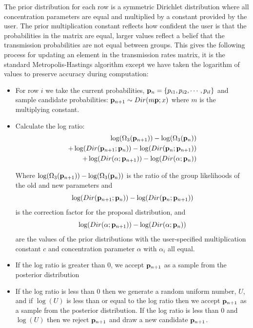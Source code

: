 \documentclass[11pt,a4paper]{report}
\begin{document}
The prior distribution for each row is a symmetric Dirichlet distribution where all concentration parameters are equal and multiplied by a constant provided by the user. The prior multiplication constant reflects how confident the user is that the probabilities in the matrix are equal, larger values reflect a belief that the transmission probabilities are not equal between groups. This gives the following process for updating an element in the transmission rates matrix, it is the standard Metropolis-Hastings algorithm except we have taken the logarithm of values to preserve accuracy during computation:
\begin{itemize}
\item For row $i$ we take the current probabilities, ${\bf p}_{n} =  \{p_{i1},p_{i2}, \cdots,p_{il}\}$ and sample candidate probabilities: ${\bf p}_{n+1} \sim Dir(m{\bf p};x)$ where $m$ is the multiplying constant.
\item Calculate the log ratio: 
\begin{equation}
\begin{split}
\log(\Omega_3({\bf p}_{n+1})) - \log(\Omega_3({\bf p}_{n})) \\ +  \log(Dir({\bf p}_{n+1};{\bf p}_{n})) - \log(Dir({\bf p}_{n};{\bf p}_{n+1})) \\ + \log(Dir({\bf \alpha};{\bf p}_{n+1})) - \log(Dir({\bf \alpha};{\bf p}_{n}))
\end{split}
\end{equation}

Where $\log(\Omega_3({\bf p}_{n+1})) - \log(\Omega_3({\bf p}_{n}))$ is the ratio of the group likelihoods of the old and new parameters and
 \[ \log(Dir({\bf p}_{n+1};{\bf p}_{n})) - \log(Dir({\bf p}_{n};{\bf p}_{n+1})) \]
is the correction factor for the proposal distribution, and
\[ \log(Dir({\bf \alpha};{\bf p}_{n+1})) - \log(Dir({\bf \alpha};{\bf p}_{n}))\]
are the values of the prior distributions with the user-specified multiplication constant $c$ and concentration parameter $\alpha$ with $\alpha_i$ all equal.
\item If  the log ratio is greater than 0, we accept ${\bf p}_{n+1}$ as a sample from the posterior distribution
\item If the log ratio is less than 0 then we generate a random uniform number, $U$, and if $\log(U)$ is less than or equal to the log ratio then we accept ${\bf p}_{n+1}$ as a sample from the posterior distribution. If the log ratio is less than 0 and $\log(U)$ then we reject ${\bf p}_{n+1}$ and draw a new candidate ${\bf p}_{n+1}$.
\end{itemize}
\end{document}
